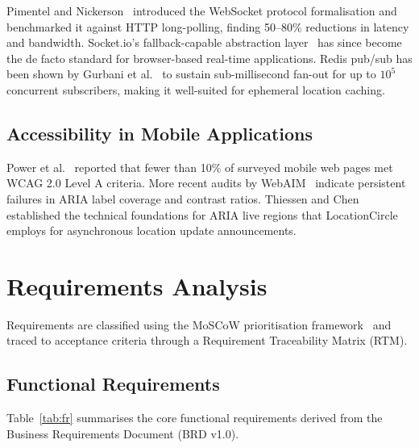 \documentclass[conference]{IEEEtran}
\begin{document}
Pimentel and Nickerson~\cite{pimentel2012} introduced the WebSocket
protocol formalisation and benchmarked it against HTTP long-polling,
finding 50–80\% reductions in latency and bandwidth. Socket.io's
fallback-capable abstraction layer~\cite{socketio} has since become
the de facto standard for browser-based real-time applications.
Redis pub/sub has been shown by Gurbani et al.~\cite{redis2020} to
sustain sub-millisecond fan-out for up to $10^5$ concurrent
subscribers, making it well-suited for ephemeral location caching.

\subsection{Accessibility in Mobile Applications}

Power et al.~\cite{power2012} reported that fewer than 10\% of
surveyed mobile web pages met WCAG 2.0 Level A criteria. More recent
audits by WebAIM~\cite{webaim2023} indicate persistent failures in
ARIA label coverage and contrast ratios. Thiessen and
Chen~\cite{thiessen2007} established the technical foundations for
ARIA live regions that LocationCircle employs for asynchronous
location update announcements.

\section{Requirements Analysis}
\label{sec:req}

Requirements are classified using the MoSCoW prioritisation
framework~\cite{moscow} and traced to acceptance criteria through a
Requirement Traceability Matrix (RTM).

\subsection{Functional Requirements}

Table~\ref{tab:fr} summarises the core functional requirements derived
from the Business Requirements Document (BRD v1.0).
\end{document}

